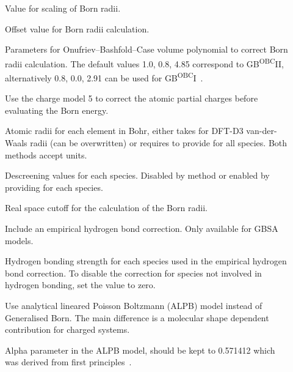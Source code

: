\begin{description}
  \item[] Value for scaling of Born radii.

  \item[] 
    Offset value for Born radii calculation.

  \item[] Parameters for Onufriev--Bashfold--Case volume
    polynomial to correct Born radii calculation.
    The default values 1.0, 0.8, 4.85 correspond to GB\textsuperscript{OBC}II,
    alternatively 0.8, 0.0, 2.91 can be used for GB\textsuperscript{OBC}I~\cite{onufriev2004}.

  \item[] Use the charge model 5 to correct the atomic partial charges
    before evaluating the Born energy.

  \item[] Atomic radii for each element in Bohr, either takes
     for DFT-D3 van-der-Waals radii (can be overwritten)
    or requires to provide  for all species.
    Both methods accept  units.

  \item[] Descreening values for each species.
    Disabled by  method or enabled by providing 
    for each species.

  \item[] 
    Real space cutoff for the calculation of the Born radii.

  \item[]
    Include an empirical hydrogen bond correction.
    Only available for GBSA models.

  \item[]
    Hydrogen bonding strength for each species used in the empirical hydrogen
    bond correction. To disable the correction for species not involved
    in hydrogen bonding, set the value to zero.

  \item[]
    Use analytical lineared Poisson Boltzmann (ALPB) model\cite{sigalov2006}
    instead of Generalised Born.
    The main difference is a molecular shape dependent contribution for charged
    systems.

  \item[]
    Alpha parameter in the ALPB model, should be kept to 0.571412 which was
    derived from first principles~\cite{sigalov2006}.
\end{description}

